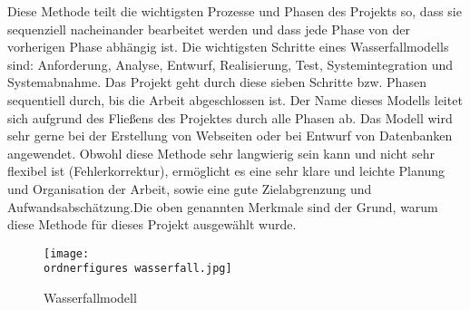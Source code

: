  Diese Methode teilt die wichtigsten Prozesse und Phasen des Projekts so, dass sie sequenziell nacheinander bearbeitet werden und dass jede Phase von der vorherigen Phase abh\"{a}ngig ist. Die wichtigsten Schritte eines Wasserfallmodells sind: Anforderung, Analyse, Entwurf, Realisierung, Test, Systemintegration und Systemabnahme. Das Projekt geht durch diese sieben Schritte bzw. Phasen sequentiell durch, bis die Arbeit abgeschlossen ist. Der Name dieses Modells leitet sich aufgrund des Flie\ss{}ens des Projektes durch alle Phasen ab.  Das Modell wird sehr gerne bei der Erstellung von Webseiten oder bei Entwurf von Datenbanken angewendet. Obwohl diese Methode sehr langwierig sein kann und nicht sehr flexibel ist (Fehlerkorrektur), erm\"{o}glicht es eine sehr klare und leichte Planung und Organisation der Arbeit, sowie eine gute Zielabgrenzung und Aufwandsabsch\"{a}tzung.Die oben genannten Merkmale sind der Grund, warum diese Methode f\"{u}r dieses Projekt ausgew\"{a}hlt wurde. 



\begin{figure}[h]
	\centering
	\texttt{[image: \\ordnerfigures
		wasserfall.jpg]}
	\caption{Wasserfallmodell}
	\label{fi:wasserfall}
\end{figure}



